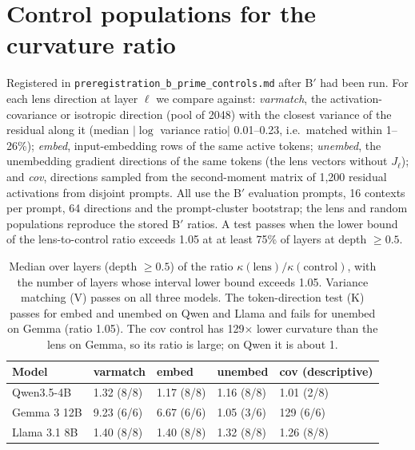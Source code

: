 \documentclass[10pt]{article}
\begin{document}
\section{Control populations for the curvature ratio}
\label{app:controls}
Registered in \texttt{preregistration\_b\_prime\_controls.md} after B$'$ had been run. For each lens direction at layer $\ell$ we compare against: \emph{varmatch}, the activation-covariance or isotropic direction (pool of 2048) with the closest variance of the residual along it (median $|\log$ variance ratio$|$ 0.01--0.23, i.e.\ matched within 1--26\%); \emph{embed}, input-embedding rows of the same active tokens; \emph{unembed}, the unembedding gradient directions of the same tokens (the lens vectors without $J_\ell$); and \emph{cov}, directions sampled from the second-moment matrix of 1,200 residual activations from disjoint prompts. All use the B$'$ evaluation prompts, 16 contexts per prompt, 64 directions and the prompt-cluster bootstrap; the lens and random populations reproduce the stored B$'$ ratios. A test passes when the lower bound of the lens-to-control ratio exceeds 1.05 at at least 75\% of layers at depth $\ge0.5$.
\begin{table}[h]
\centering\small
\begin{tabular}{@{}lllll@{}}
\toprule
Model & varmatch & embed & unembed & cov (descriptive) \\
\midrule
Qwen3.5-4B & 1.32 (8/8) & 1.17 (8/8) & 1.16 (8/8) & 1.01 (2/8) \\
Gemma 3 12B & 9.23 (6/6) & 6.67 (6/6) & 1.05 (3/6) & 129 (6/6) \\
Llama 3.1 8B & 1.40 (8/8) & 1.40 (8/8) & 1.32 (8/8) & 1.26 (8/8) \\
\bottomrule
\end{tabular}
\caption{\label{tab:controls}Median over layers (depth $\ge0.5$) of the ratio $\kappa(\text{lens})/\kappa(\text{control})$, with the number of layers whose interval lower bound exceeds 1.05. Variance matching (V) passes on all three models. The token-direction test (K) passes for embed and unembed on Qwen and Llama and fails for unembed on Gemma (ratio 1.05). The cov control has 129$\times$ lower curvature than the lens on Gemma, so its ratio is large; on Qwen it is about 1.}
\end{table}
\end{document}

